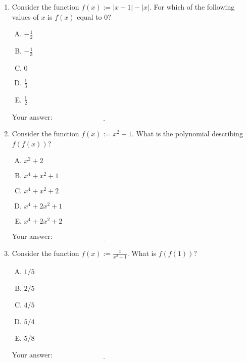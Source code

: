 \documentclass[10pt]{amsart}
\begin{document}
\begin{enumerate}

\item Consider the function $f(x) := |x + 1| - |x|$. For which of the
  following values of $x$ is $f(x)$ equal to $0$?

  \begin{enumerate}[(A)]
  \item $-\frac{1}{2}$
  \item $-\frac{1}{3}$
  \item $0$
  \item $\frac{1}{3}$
  \item $\frac{1}{2}$
  \end{enumerate}

  \vspace{0.1in}
  Your answer: $\underline{\qquad\qquad\qquad\qquad\qquad\qquad\qquad}$
  \vspace{1in}
  
\item Consider the function $f(x) := x^2 + 1$. What is the polynomial
  describing $f(f(x))$?

  \begin{enumerate}[(A)]
  \item $x^2 + 2$
  \item $x^4 + x^2 + 1$
  \item $x^4 + x^2 + 2$
  \item $x^4 + 2x^2 + 1$
  \item $x^4 + 2x^2 + 2$
  \end{enumerate}

  \vspace{0.1in}
  Your answer: $\underline{\qquad\qquad\qquad\qquad\qquad\qquad\qquad}$
  \vspace{1in}

\item Consider the function $f(x) := \frac{x}{x^2 + 1}$. What is $f(f(1))$?

  \begin{enumerate}[(A)]
  \item $1/5$
  \item $2/5$
  \item $4/5$
  \item $5/4$
  \item $5/8$
  \end{enumerate}

  \vspace{0.1in}
  Your answer: $\underline{\qquad\qquad\qquad\qquad\qquad\qquad\qquad}$
  \vspace{1in}


\end{enumerate}
\end{document}
